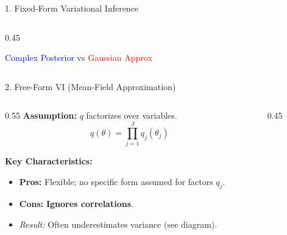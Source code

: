 \documentclass[aspectratio=169]{beamer}
\begin{document}
\begin{frame}{1. Fixed-Form Variational Inference}
\begin{columns}
\begin{column}{0.45\textwidth}
            \vspace{0.2em}
            \footnotesize{\textcolor{blue}{Complex Posterior} vs \textcolor{red}{Gaussian Approx}}
        \end{column}
    \end{columns}
\end{frame}

\begin{frame}{2. Free-Form VI (Mean-Field Approximation)}
    \begin{columns}
        \begin{column}{0.55\textwidth}
            \textbf{Assumption:} $q$ factorizes over variables.
            $$ q(\theta) = \prod_{j=1}^{J} q_j(\theta_j) $$
            
            \vspace{0.5em}
            \textbf{Key Characteristics:}
            \begin{itemize}
                \item \textbf{Pros:} Flexible; no specific form assumed for factors $q_j$.
                \item \textbf{Cons:} \textbf{Ignores correlations}.
                \item \emph{Result:} Often underestimates variance (see diagram).
            \end{itemize}
        \end{column}
        
        \begin{column}{0.45\textwidth}
            \centering
\end{column}
\end{columns}
\end{frame}
\end{document}
